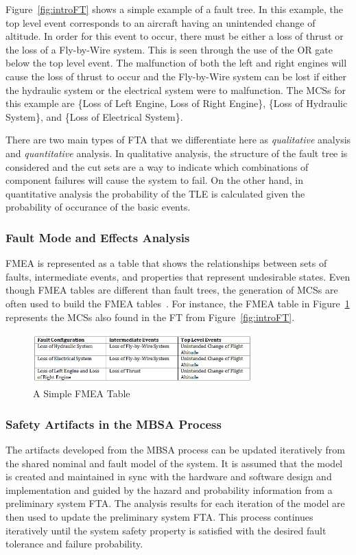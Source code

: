Figure~\ref{fig:introFT} shows a simple example of a fault tree. In this example, the top level event corresponds to an aircraft having an unintended change of altitude. In order for this event to occur, there must be either a loss of thrust or the loss of a Fly-by-Wire system. This is seen through the use of the OR gate below the top level event. The malfunction of both the left and right engines will cause the loss of thrust to occur and the Fly-by-Wire system can be lost if either the hydraulic system or the electrical system were to malfunction. The MCSs for this example are \{Loss of Left Engine, Loss of Right Engine\}, \{Loss of Hydraulic System\}, and \{Loss of Electrical System\}. 

There are two main types of FTA that we differentiate here as \textit{qualitative} analysis and \textit{quantitative} analysis. In qualitative analysis, the structure of the fault tree is considered and the cut sets are a way to indicate which combinations of component failures will cause the system to fail. On the other hand, in quantitative analysis the probability of the TLE is calculated given the probability of occurance of the basic events. 


\subsubsection{Fault Mode and Effects Analysis}
FMEA is represented as a table that shows the relationships between sets of faults, intermediate events, and properties that represent undesirable states. Even though FMEA tables are different than fault trees, the generation of MCSs are often used to build the FMEA tables~\cite{Bozzano:2010:DSA:1951720}. For instance, the FMEA table in Figure~\ref{fig:introFMEA} represents the MCSs also found in the FT from Figure~\ref{fig:introFT}.

\begin{figure}[h]
\begin{center}
\includegraphics[width=8.5cm]{images/fmea.png}
\caption{A Simple FMEA Table} \label{fig:introFMEA}
\end{center}
\end{figure}

\subsubsection{Safety Artifacts in the MBSA Process}
The artifacts developed from the MBSA process can be updated iteratively from the shared nominal and fault model of the system. It is assumed that the model is created and maintained in sync with the hardware and software design and implementation and guided by the hazard and probability information from a preliminary system FTA. The analysis results for each iteration of the model are then used to update the preliminary system FTA. This process continues iteratively until the system safety property is satisfied with the desired fault tolerance and failure probability. 



